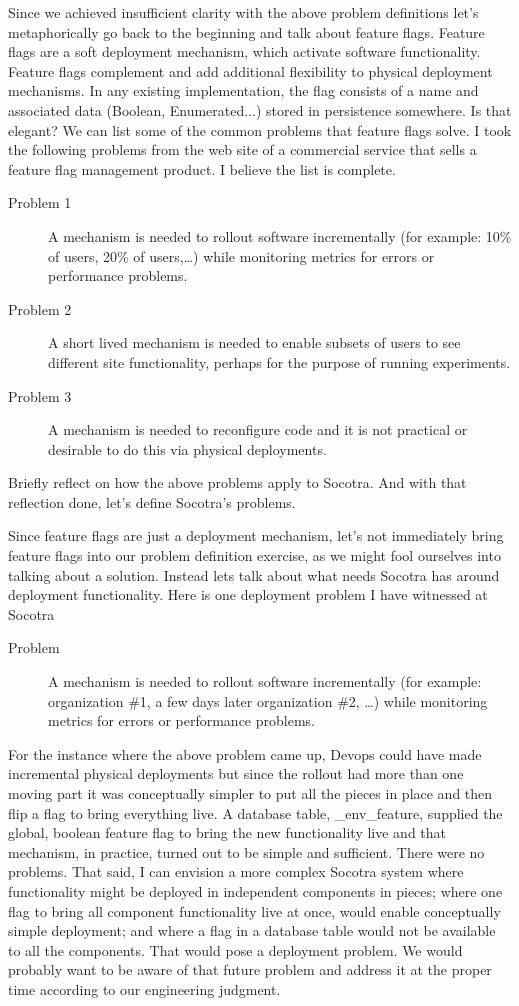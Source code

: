 Since we achieved insufficient clarity with the above problem definitions let's metaphorically go back to the beginning and talk about feature
flags. Feature flags are a soft deployment mechanism, which activate software functionality. Feature flags complement and add additional
flexibility to physical deployment mechanisms. In any existing implementation, the flag consists of a name and associated data (Boolean,
Enumerated...) stored in persistence somewhere. Is that elegant? We can list some of the common problems that feature flags solve. I took
the following problems from the web site of a commercial service that sells a feature flag management product. I believe the list is complete.

\begin{description}
  \item[Problem 1] A mechanism is needed to rollout software incrementally (for example: 10\% of users, 20\% of users,\dots) while monitoring
  metrics for errors or performance problems.
  \item[Problem 2] A short lived mechanism is needed to enable subsets of users to see different site functionality, perhaps for the purpose of
  running experiments.
  \item[Problem 3] A mechanism is needed to reconfigure code and it is not practical or desirable to do this via physical deployments.
\end{description}
Briefly reflect on how the above problems apply to Socotra. And with that reflection done, let's define Socotra's
problems.

Since feature flags are just a deployment mechanism, let's not immediately bring feature flags into our problem definition exercise, as we might
fool ourselves into
talking about a solution. Instead lets talk about what needs Socotra has around deployment functionality. Here is one deployment problem I
have witnessed at Socotra
\begin{description}
  \item[Problem] A mechanism is needed to rollout software incrementally (for example: organization \#1, a few days later organization \#2, \dots) while monitoring
  metrics for errors or performance problems.
\end{description}
For the instance where the above problem came up, Devops could have made incremental physical deployments but since the rollout had
more than one moving part it was conceptually simpler to put all the pieces in place and then flip a flag to bring everything live.
A database table, \_env\_feature, supplied the global, boolean feature flag to bring the new functionality live and that mechanism, in practice, turned out to be
simple and sufficient. There were no problems. That said, I can envision a more complex Socotra system where functionality might be
deployed in independent components in pieces; where one flag to bring all component functionality live at once, would enable conceptually simple deployment;
and where a flag in a database table would not be available to all the components. That would pose a deployment problem. We would probably
want to be aware of that future problem and address it at the proper time according to our engineering judgment.

